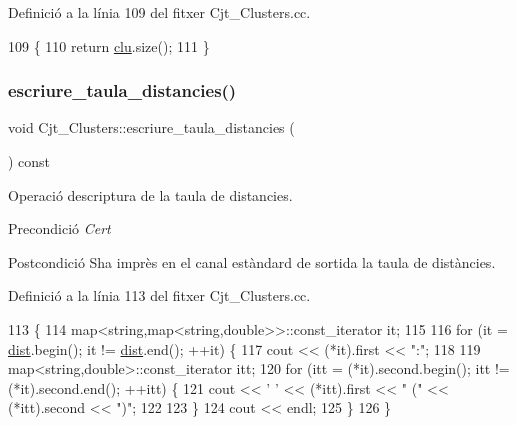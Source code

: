 Definició a la línia 109 del fitxer Cjt\+\_\+\+Clusters.\+cc.


\begin{DoxyCode}
109                                         \{
110     \textcolor{keywordflow}{return} \hyperlink{class_cjt___clusters_a86fd6089c4e49eaedea86d5ec4ee6495}{clu}.size();
111 \}
\end{DoxyCode}
\mbox{\label{class_cjt___clusters_a0a2476e10eec73bccddae9a2c6b998d2}} 
\subsubsection{\texorpdfstring{escriure\+\_\+taula\+\_\+distancies()}{escriure\_taula\_distancies()}}
{\footnotesize\ttfamily void Cjt\+\_\+\+Clusters\+::escriure\+\_\+taula\+\_\+distancies (\begin{DoxyParamCaption}{ }\end{DoxyParamCaption}) const}



Operació d\textquotesingle{}escriptura de la taula de distancies. 

\begin{DoxyPrecond}{Precondició}
{\itshape Cert} 
\end{DoxyPrecond}
\begin{DoxyPostcond}{Postcondició}
S\textquotesingle{}ha imprès en el canal estàndard de sortida la taula de distàncies. 
\end{DoxyPostcond}


Definició a la línia 113 del fitxer Cjt\+\_\+\+Clusters.\+cc.


\begin{DoxyCode}
113                                                    \{
114     map<string,map<string,double>>::const\_iterator it;
115     
116     \textcolor{keywordflow}{for} (it = \hyperlink{class_cjt___clusters_afde449634787205786301b40e053fe91}{dist}.begin(); it != \hyperlink{class_cjt___clusters_afde449634787205786301b40e053fe91}{dist}.end(); ++it) \{ 
117         cout << (*it).first << \textcolor{stringliteral}{":"};
118         
119         map<string,double>::const\_iterator itt;
120         \textcolor{keywordflow}{for} (itt = (*it).second.begin(); itt != (*it).second.end(); ++itt) \{
121             cout << \textcolor{charliteral}{' '} << (*itt).first << \textcolor{stringliteral}{" ("} << (*itt).second << \textcolor{stringliteral}{")"};
122         
123         \}
124         cout << endl;
125     \}
126 \}
\end{DoxyCode}
\mbox{\label{class_cjt___clusters_acd1311eabbf986a9e45e373e06976b42}} 

